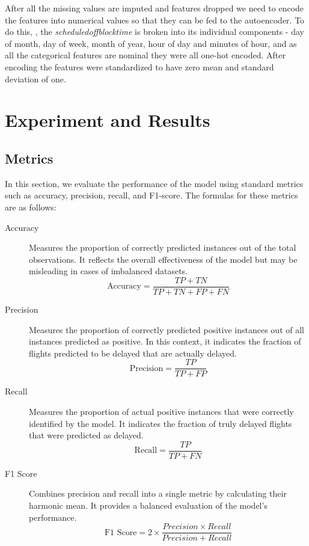 \documentclass[twoside,11pt]{article}
\begin{document}
After all the missing values are imputed and features dropped we need to encode the features into numerical values so that they can be fed to the autoencoder. To do this, , the \emph{scheduledoffblocktime} is broken into its individual components - day of month, day of week, month of year, hour of day and minutes of hour, and as all the categorical features are nominal they were all one-hot encoded. After encoding the features were standardized to have zero mean and standard deviation of one.


\section{Experiment and Results}
\subsection{Metrics}

In this section, we evaluate the performance of the model using standard metrics such as accuracy, precision, recall, and F1-score. The formulas for these metrics are as follows:

\begin{description}
    \item[Accuracy] Measures the proportion of correctly predicted instances out of the total observations. It reflects the overall effectiveness of the model but may be misleading in cases of imbalanced datasets.
        \[
        \text{Accuracy} = \frac{TP + TN}{TP + TN + FP + FN}
        \]
    \item[Precision] Measures the proportion of correctly predicted positive instances out of all instances predicted as positive. In this context, it indicates the fraction of flights predicted to be delayed that are actually delayed.
        $$
        \text{Precision} = \frac{TP}{TP + FP}
        $$
    \item[Recall] Measures the proportion of actual positive instances that were correctly identified by the model. It indicates the fraction of truly delayed flights that were predicted as delayed.
        $$
        \text{Recall} = \frac{TP}{TP + FN}
        $$  
    \item[F1 Score] Combines precision and recall into a single metric by calculating their harmonic mean. It provides a balanced evaluation of the model’s performance.
        $$
        \text{F1 Score} = 2 \times \frac{Precision \times Recall}{Precision + Recall}
        $$
\end{description} 
\end{document}
